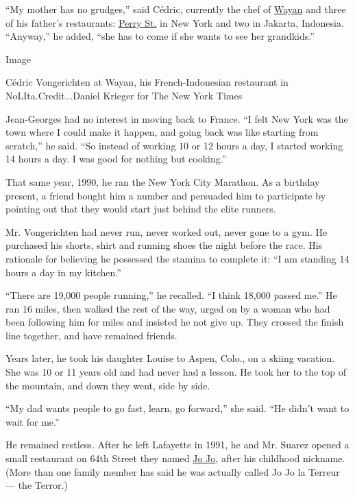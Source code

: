 ``My mother has no grudges,'' said Cédric, currently the chef of
\href{https://www.nytimes3xbfgragh.onion/2019/04/23/dining/wayan-restaurant-review.html}{Wayan}
and three of his father's restaurants:
\href{https://www.nytimes3xbfgragh.onion/2005/09/07/dining/reviews/showmanship-yields-to-elegance.html}{Perry
St.} in New York and two in Jakarta, Indonesia. ``Anyway,'' he added,
``she has to come if she wants to see her grandkids.''

Image

Cédric Vongerichten at Wayan, his French-Indonesian restaurant in
NoLIta.Credit...Daniel Krieger for The New York Times

Jean-Georges had no interest in moving back to France. ``I felt New York
was the town where I could make it happen, and going back was like
starting from scratch,'' he said. ``So instead of working 10 or 12 hours
a day, I started working 14 hours a day. I was good for nothing but
cooking.''

That same year, 1990, he ran the New York City Marathon. As a birthday
present, a friend bought him a number and persuaded him to participate
by pointing out that they would start just behind the elite runners.

Mr. Vongerichten had never run, never worked out, never gone to a gym.
He purchased his shorts, shirt and running shoes the night before the
race. His rationale for believing he possessed the stamina to complete
it: ``I am standing 14 hours a day in my kitchen.''

``There are 19,000 people running,'' he recalled. ``I think 18,000
passed me.'' He ran 16 miles, then walked the rest of the way, urged on
by a woman who had been following him for miles and insisted he not give
up. They crossed the finish line together, and have remained friends.

Years later, he took his daughter Louise to Aspen, Colo., on a skiing
vacation. She was 10 or 11 years old and had never had a lesson. He took
her to the top of the mountain, and down they went, side by side.

``My dad wants people to go fast, learn, go forward,'' she said. ``He
didn't want to wait for me.''

He remained restless. After he left Lafayette in 1991, he and Mr. Suarez
opened a small restaurant on 64th Street they named
\href{https://www.jojorestaurantnyc.com/}{Jo Jo}, after his childhood
nickname. (More than one family member has said he was actually called
Jo Jo la Terreur --- the Terror.)

